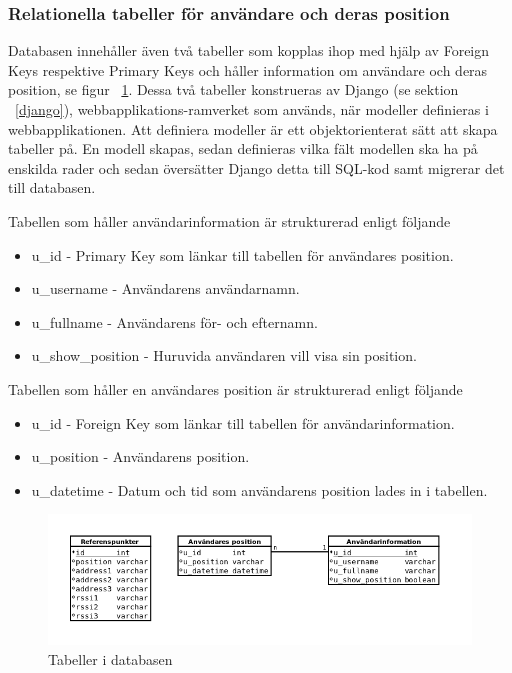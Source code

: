 \documentclass[a4paper,12pt]{article}
\begin{document}
 \subsubsection{Relationella tabeller för användare och deras position}
 Databasen innehåller även två tabeller som
 kopplas ihop med hjälp av Foreign Keys respektive Primary Keys och håller information om användare och deras position, se figur ~\ref{fig:db_tabeller}.
 Dessa två tabeller konstrueras av Django (se sektion ~\ref{django}), webbapplikations-ramverket som används, när modeller definieras i webbapplikationen. Att definiera modeller är ett objektorienterat sätt att skapa tabeller på. En modell skapas, sedan definieras vilka fält modellen ska ha på enskilda rader och sedan översätter Django detta till SQL-kod samt migrerar det till databasen.

 Tabellen som håller användarinformation är strukturerad enligt följande
 \begin{itemize}
   \item  u\_id - Primary Key som länkar till tabellen för användares position.
   \item  u\_username - Användarens användarnamn.
   \item  u\_fullname - Användarens för- och efternamn.
   \item  u\_show\_position - Huruvida användaren vill visa sin position.
 \end{itemize}

 Tabellen som håller en användares position är strukturerad enligt följande
 \begin{itemize}
   \item u\_id - Foreign Key som länkar till tabellen för användarinformation.
   \item u\_position - Användarens position.
   \item u\_datetime - Datum och tid som användarens position lades in i tabellen.
 \end{itemize}

 \begin{figure}[H]
   \includegraphics[width=15cm]{media/db_tabeller.png}
   \caption{Tabeller i databasen}
   \label{fig:db_tabeller}
 \end{figure}
\end{document}
